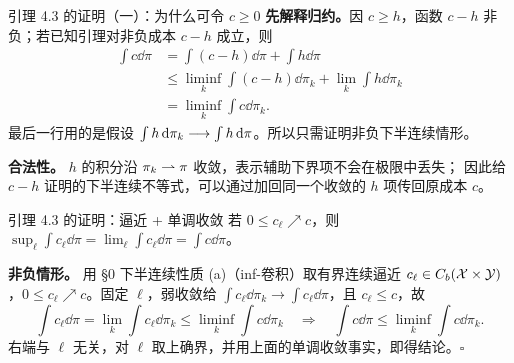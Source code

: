 \begin{frame}{引理 4.3 的证明（一）：为什么可令 $c\ge0$}
  \textbf{先解释归约。}\proofskipnote 因 $c\ge h$，函数 $c-h$ 非负；若已知引理对非负成本 $c-h$ 成立，则
  \[
    \begin{aligned}
      \int c\dd\pi
      &= \int(c-h)\dd\pi+\int h\dd\pi\\
      &\le \liminf_{k}\int(c-h)\dd\pi_k+\lim_{k}\int h\dd\pi_k\\
      &= \liminf_{k}\int c\dd\pi_k .
    \end{aligned}
  \]
  最后一行用的是假设 $\int h\,\mathrm{d}\pi_k\longrightarrow\int h\,\mathrm{d}\pi$。所以只需证明非负下半连续情形。

  \textbf{合法性。} $h$ 的积分沿 $\pi_k\rightharpoonup\pi$ 收敛，表示辅助下界项不会在极限中丢失；
  因此给 $c-h$ 证明的下半连续不等式，可以通过加回同一个收敛的 $h$ 项传回原成本 $c$。

\end{frame}

\begin{frame}{引理 4.3 的证明：逼近 + 单调收敛}
  若 $0\le c_{\ell}\nearrow c$，则 $\sup_{\ell}\int c_{\ell}\dd\pi=\lim_{\ell}\int c_{\ell}\dd\pi=\int c\dd\pi$。\proofskipnote

  \textbf{非负情形。} 用 §0 下半连续性质 (a)（inf-卷积）取有界连续逼近
  $c_{\ell}\in C_b(\mathcal{X}\times\mathcal{Y})$，$0\le c_{\ell}\nearrow c$。固定 $\ell$，弱收敛给
  $\int c_{\ell}\dd\pi_k\to\int c_{\ell}\dd\pi$，且 $c_{\ell}\le c$，故
  \[
    \int c_{\ell}\dd\pi
    = \lim_{k}\int c_{\ell}\dd\pi_k
    \le \liminf_{k}\int c\dd\pi_k
    \quad\Longrightarrow\quad
    \int c\dd\pi\le \liminf_{k}\int c\dd\pi_k .
  \]
  右端与 $\ell$ 无关，对 $\ell$ 取上确界，并用上面的单调收敛事实，即得结论。\hfill$\square$
\end{frame}

